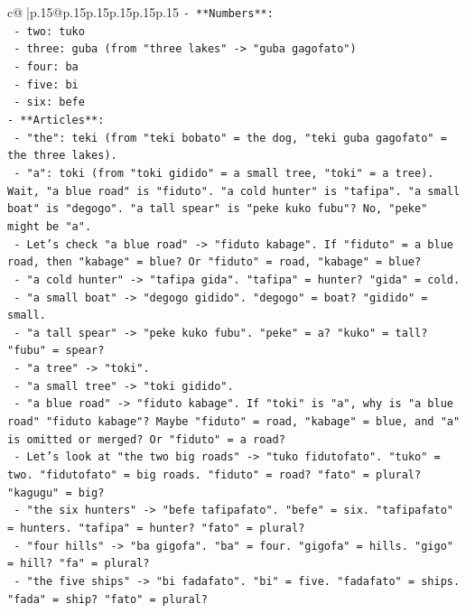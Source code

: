 \documentclass{article}
\begin{document}
{\begin{supertabular}{c@{$\;$}|p{.15\linewidth}@{}p{.15\linewidth}p{.15\linewidth}p{.15\linewidth}p{.15\linewidth}p{.15\linewidth}}
{{{\texttt{{-} **Numbers**:} \\
\texttt{  {-} two: tuko} \\
\texttt{  {-} three: guba (from "three lakes" {-}> "guba gagofato")} \\
\texttt{  {-} four: ba} \\
\texttt{  {-} five: bi} \\
\texttt{  {-} six: befe} \\
\texttt{{-} **Articles**:} \\
\texttt{  {-} "the": teki (from "teki bobato" = the dog, "teki guba gagofato" = the three lakes).} \\
\texttt{  {-} "a": toki (from "toki gidido" = a small tree, "toki" = a tree). Wait, "a blue road" is "fiduto". "a cold hunter" is "tafipa". "a small boat" is "degogo". "a tall spear" is "peke kuko fubu"? No, "peke" might be "a".} \\
\texttt{  {-} Let's check "a blue road" {-}> "fiduto kabage". If "fiduto" = a blue road, then "kabage" = blue? Or "fiduto" = road, "kabage" = blue?} \\
\texttt{  {-} "a cold hunter" {-}> "tafipa gida". "tafipa" = hunter? "gida" = cold.} \\
\texttt{  {-} "a small boat" {-}> "degogo gidido". "degogo" = boat? "gidido" = small.} \\
\texttt{  {-} "a tall spear" {-}> "peke kuko fubu". "peke" = a? "kuko" = tall? "fubu" = spear?} \\
\texttt{  {-} "a tree" {-}> "toki".} \\
\texttt{  {-} "a small tree" {-}> "toki gidido".} \\
\texttt{  {-} "a blue road" {-}> "fiduto kabage". If "toki" is "a", why is "a blue road" "fiduto kabage"? Maybe "fiduto" = road, "kabage" = blue, and "a" is omitted or merged? Or "fiduto" = a road?} \\
\texttt{  {-} Let's look at "the two big roads" {-}> "tuko fidutofato". "tuko" = two. "fidutofato" = big roads. "fiduto" = road? "fato" = plural? "kagugu" = big?} \\
\texttt{  {-} "the six hunters" {-}> "befe tafipafato". "befe" = six. "tafipafato" = hunters. "tafipa" = hunter? "fato" = plural?} \\
\texttt{  {-} "four hills" {-}> "ba gigofa". "ba" = four. "gigofa" = hills. "gigo" = hill? "fa" = plural?} \\
\texttt{  {-} "the five ships" {-}> "bi fadafato". "bi" = five. "fadafato" = ships. "fada" = ship? "fato" = plural?} \\
}}}
\end{supertabular}}
\end{document}
